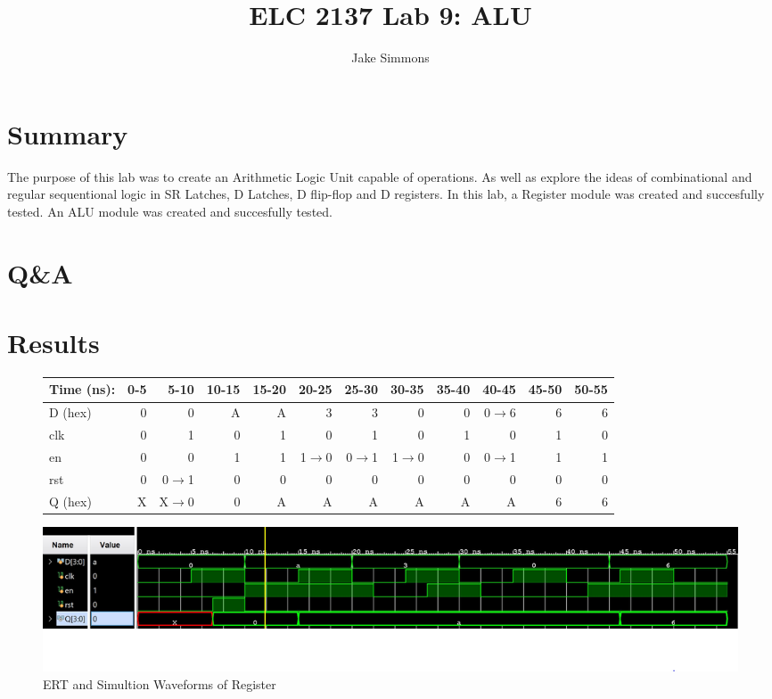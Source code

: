 \documentclass[11pt]{article}
\begin{document}
\title{ELC 2137 Lab 9: ALU}
\author{Jake Simmons}

\maketitle


\section*{Summary}

The purpose of this lab was to create an Arithmetic Logic Unit capable of operations. As well as explore the ideas of combinational and regular sequentional logic in SR Latches, D Latches, D flip-flop and D registers. In this lab, a Register module was created and succesfully tested. An ALU module was created and succesfully tested.  


\section*{Q\&A}



\section*{Results}

\begin{figure}[ht]\centering
	\begin{tabular}{l|rrrrrrrrrrr}
		Time (ns): & 0-5 & 5-10 & 10-15 & 15-20 & 20-25 & 25-30 & 30-35 & 35-40 & 40-45 & 45-50 & 50-55 \\
		\midrule
		D (hex) & 0 & 0 & A & A & 3 & 3 & 0 & 0 & 0$\rightarrow$6 & 6 & 6 \\
		clk & 0 & 1 & 0 & 1 & 0 & 1 & 0 & 1 & 0 & 1 & 0  \\
		en & 0 & 0 & 1 & 1 & 1$\rightarrow$0 & 0$\rightarrow$1 & 1$\rightarrow$0 & 0 & 0$\rightarrow$1 & 1 & 1 \\
		rst & 0 & 0$\rightarrow$1 & 0 & 0 & 0 & 0 & 0 & 0 & 0 & 0 & 0 \\
		\midrule 
		Q (hex) & X & X$\rightarrow$0 & 0 & A & A & A & A & A & A & 6 & 6 \\
		\bottomrule
	\end{tabular}\medskip
	
	\includegraphics{register_test.JPG}
	\caption{ERT and Simultion Waveforms of Register}
	\label{fig:sim_with_table}
\end{figure}
\end{document}

